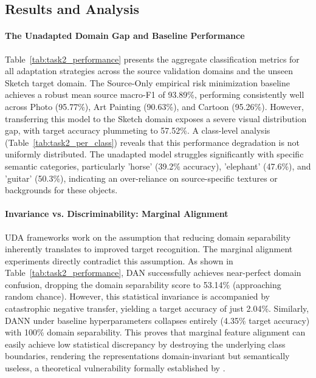 \documentclass{article}
\begin{document}
\subsection{Results and Analysis}

\paragraph{The Unadapted Domain Gap and Baseline Performance}
Table~\ref{tab:task2_performance} presents the aggregate classification metrics for all adaptation strategies across the source validation domains and the unseen Sketch target domain. The Source-Only empirical risk minimization baseline achieves a robust mean source macro-F1 of 93.89\%, performing consistently well across Photo (95.77\%), Art Painting (90.63\%), and Cartoon (95.26\%). However, transferring this model to the Sketch domain exposes a severe visual distribution gap, with target accuracy plummeting to 57.52\%. A class-level analysis (Table~\ref{tab:task2_per_class}) reveals that this performance degradation is not uniformly distributed. The unadapted model struggles significantly with specific semantic categories, particularly 'horse' (39.2\% accuracy), 'elephant' (47.6\%), and 'guitar' (50.3\%), indicating an over-reliance on source-specific textures or backgrounds for these objects.

\paragraph{Invariance vs. Discriminability: Marginal Alignment}
UDA frameworks work on the assumption that reducing domain separability inherently translates to improved target recognition. The marginal alignment experiments directly contradict this assumption. As shown in Table~\ref{tab:task2_performance}, DAN successfully achieves near-perfect domain confusion, dropping the domain separability score to 53.14\% (approaching random chance). However, this statistical invariance is accompanied by catastrophic negative transfer, yielding a target accuracy of just 2.04\%. Similarly, DANN under baseline hyperparameters collapses entirely (4.35\% target accuracy) with 100\% domain separability. This proves that marginal feature alignment can easily achieve low statistical discrepancy by destroying the underlying class boundaries, rendering the representations domain-invariant but semantically useless, a theoretical vulnerability formally established by \citet{pmlr-v97-zhao19a}.
\end{document}

